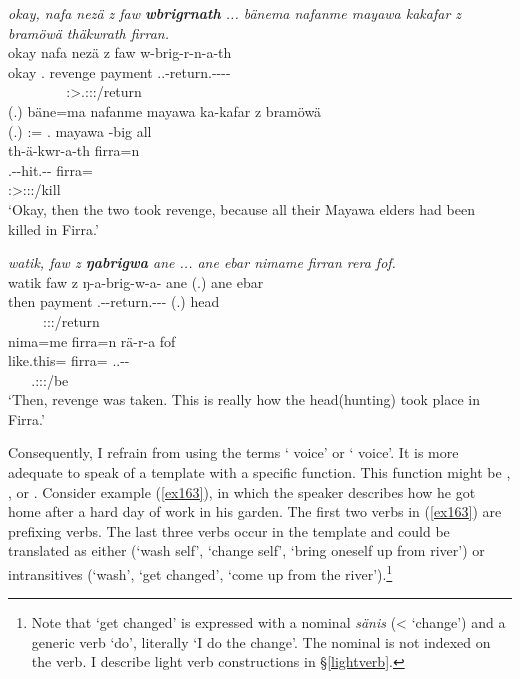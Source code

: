 \begin{exe}
	\ex
	\begin{xlist}
	\ex	\emph{okay, nafa nezä z faw \textbf{wbrigrnath} ... bänema nafanme mayawa kakafar z bramöwä thäkwrath firran.}\\
	\glll okay nafa nezä z faw w-brig-r-n-a-th\\
	okay \Tnsg.{\Erg} revenge {\Iam} payment \Tsg.\F.\Alph-return.\Ext-\Lk-\Du-\Pst-\Stnsg{}\\
	~ ~ ~ ~ ~ {\footnotesize \Stdu:\Sbj>\Tsg.\F:\Obj:\Pst:\Ipfv/return}\\
	\sn
	\gll (.) bäne=ma nafanme mayawa ka-kafar z bramöwä\\
	(.) \Dem:\Med={\Char} \Tnsg.{\Poss} mayawa \Redup-big {\Iam} all\\
	\sn
	\glll th-ä-kwr-a-th firra=n\\
	\Stnsg.\Gam-\Vc\textbar\Ndu-hit.\Rs-\Pst-\Stnsg{} firra=\Loc\\
	{\footnotesize \Stpl:\Sbj>\Stpl:\Obj:\Pst:\Pfv/kill} ~\\
	\trans `Okay, then the two took revenge, because all their Mayawa elders had been killed in Firra.' 
	\label{ex159}

	\ex	\emph{watik, faw z \textbf{ŋabrigwa} ane ... ane ebar nimame firran rera fof.}\\
	\glll watik faw z ŋ-a-brig-w-a-\Zero{} ane (.) ane ebar\\
	then payment {\Iam} \M.\Alph-\Vc-return.\Ext-\Ndu-\Pst-\Stsg{} {\Dem} (.) {\Dem} head\\
	~ ~ ~ {\footnotesize \Stsg:\Sbj:\Pst:\Ipfv/return} ~ ~ ~ ~\\
	\glll nima=me firra=n rä-r-a fof\\
	like.this={\Ins} firra={\Loc} \Tsg.\F.\Cop-\Lk-\Pst{} \Emph\\
	~ ~ {\footnotesize \Tsg.\F:\Sbj:\Pst:\Ipfv/be} ~\\
	\trans `Then, revenge was taken. This is really how the head(hunting) took place in Firra.' 
	\label{ex329}
	\end{xlist}
\end{exe}

Consequently, I refrain from using the terms ` voice' or ` voice'. It is more adequate to speak of a  template with a specific function. This function might be , ,  or . Consider example (\ref{ex163}), in which the speaker describes how he got home after a hard day of work in his garden. The first two verbs in (\ref{ex163}) are prefixing verbs. The last three verbs occur in the  template and could be translated as either  (`wash self', `change self', `bring oneself up from river') or intransitives (`wash', `get changed', `come up from the river').\footnote{Note that `get changed' is expressed with a nominal \emph{sänis} (<  `change') and a generic verb `do', literally `I do the change'. The nominal is not indexed on the verb. I describe light verb constructions in \S\ref{lightverb}.}

